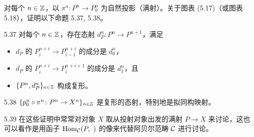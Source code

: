 
对每个 $n\in\mathbb{Z}$，以 $\pi^n\colon P^n\to P_0^n$ 为自然投影（满射）。关于图表 (5.17)（或图表 5.18），证明以下命题 5.37, 5.38。

\begin{proposition}{5.37}
对每个 $n\in\mathbb{Z}$，存在态射 $d_P^n\colon P^n\to P^{n+1}$，满足
\begin{itemize}
  \item $d_P$ 的 $P_i^{n+i}\to P_{i-1}^{n+i}$ 的成分是 $d_0^n$，
  \item $d_P$ 的 $P_i^{n+i}\to P_i^{n+i+1}$ 的成分是 $d_1^n$，且
  \item $\{P^n,d_P^n\}_{n\in\mathbb{Z}}$ 构成复形。
\end{itemize}
\end{proposition}

\begin{proposition}{5.38}
$\{p_0^n\circ\pi^n\colon P^n\to X^n\}_{n\in\mathbb{Z}}$ 是复形的态射，特别地是拟同构映射。
\end{proposition}

\begin{remark}{5.39}
在这些证明中常常对对象 $X$ 取从投射对象出发的满射 $P\to X$ 来讨论，这也可以看作是用函子 $\Hom_{\cC}(P,\ )$ 的像来代替阿贝尔范畴 $\mathcal{C}$ 进行讨论。
\end{remark}

